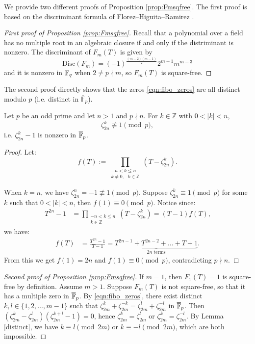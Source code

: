 We provide two different proofs of Proposition \ref{prop:Fmsqfree}.
The first proof is based on the discriminant formula of Florez--Higuita--Ramirez \cite{florez2019resultant}.

\begin{proof}[First proof of Proposition \ref{prop:Fmsqfree}]
    Recall that a polynomial over a field has no multiple root in an algebraic closure if and only if the distriminant is nonzero.
    The discriminant of \(F_m(T)\) is given by \cite[Theorem 4]{florez2019resultant}
    \[
        \mathrm{Disc}(F_m) = (-1)^{\frac{(m-2)(m-1)}{2}} 2^{m-1} m^{m-3}
    \]
    and it is nonzero in \(\mathbb{F}_q\) when \(2 \ne p \nmid m\), so \(F_m(T)\) is square-free.
\end{proof}

The second proof directly shows that the zeros \eqref{eqn:fibo_zeros} are all distinct modulo $p$ (i.e. distinct in $\overline{\mathbb{F}}_p$).

\begin{lemma} \label{distinct}
Let $p$ be an odd prime and let $n > 1$ and $p \nmid n$. For $k \in \mathbb{Z}$ with $0 < |k| < n$,
$$\zeta_{2n}^k \not \equiv 1 \pmod p,$$
i.e. $\zeta_{2n}^k - 1$ is nonzero in $\overline{\mathbb{F}}_p$.
\end{lemma}

\begin{proof}
Let:
$$f(T) := \prod_{\substack{-n < k \leq n \\ k \neq 0, \text{ } k \in \mathbb{Z}}} (T - \zeta_{2n}^k) \text{.}$$

When $k = n$, we have $\zeta_{2n}^n = -1 \not \equiv 1 \pmod p$. Suppose $\zeta_{2n}^k \equiv 1 \pmod p$ for some $k$ such that $0 < |k| < n$, then $f(1)\equiv 0\pmod p$.
Notice since:
    \begin{align*}
        T^{2n}-1 &= \prod_{\substack{-n < k \le n \\ k \in \mathbb{Z}}}(T-\zeta_{2n}^k)
        = (T - 1) f(T) \text{,}
    \end{align*}
we have:
\begin{align*}
    f(T) &= \frac{T^{2n} - 1}{T - 1} = \underbrace{T^{2n - 1} + T^{2n - 2} + \dots + T + 1}_{2n \text{ terms}} \text{.}
\end{align*}
From this we get $f(1) = 2n$ and $f(1) \equiv 0 \pmod{p}$, contradicting $p \nmid n$.
\end{proof}

\begin{proof}[Second proof of Proposition \ref{prop:Fmsqfree}]
    If $m = 1$, then $F_1(T) = 1$ is square-free by definition. Assume $m > 1$.
    Suppose $F_m(T)$ is not square-free, so that it has a multiple zero in $\overline{\mathbb{F}}_p$.
    By \eqref{eqn:fibo_zeros}, there exist distinct $k, l \in \{1, 2, \dots, m - 1\}$ such that $\zeta_{2m}^{k} + \zeta_{2m}^{-k} = \zeta_{2m}^{l} + \zeta_{2m}^{-l}$ in $\overline{\mathbb{F}}_p$.
    Then $(\zeta_{2m}^{k} - \zeta_{2m}^{l})(\zeta_{2m}^{k + l} - 1) = 0$, hence $\zeta_{2m}^{k} = \zeta_{2m}^{l}$ or $\zeta_{2m}^{k} = \zeta_{2m}^{-l}$.
    By Lemma \ref{distinct}, we have $k \equiv l \pmod{2m}$ or $k \equiv -l \pmod{2m}$, which are both impossible.
\end{proof}

